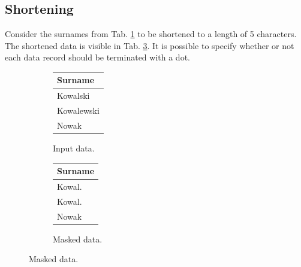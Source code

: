 \documentclass[a4paper,twoside,12pt]{book}
\begin{document}
\subsection{Shortening}
Consider the surnames from Tab. \ref{id:tab:shortening_raw} to be shortened to a length of 5 characters.
%
%
The shortened data is visible in Tab. \ref{id:tab:shortening_masked}.
%
%
It is possible to specify whether or not each data record should be terminated with a dot.


\begin{figure}
\centering
\caption{Shortening.}
\begin{subfigure}{.4\textwidth}
\centering
\caption{Input data.}
\label{id:tab:shortening_raw}
\begin{tabular}{l}
\toprule
Surname    \\ \midrule
Kowalski   \\
Kowalewski \\
Nowak      \\ \bottomrule
\end{tabular}
\end{subfigure}
\begin{subfigure}{.4\textwidth}
\centering
\caption{Masked data.}
\label{id:tab:shortening_masked}
\begin{tabular}{l}
\toprule
Surname    \\ \midrule
Kowal.     \\
Kowal.     \\
Nowak      \\ \bottomrule
\end{tabular}
\end{subfigure}
\end{figure}
\end{document}
